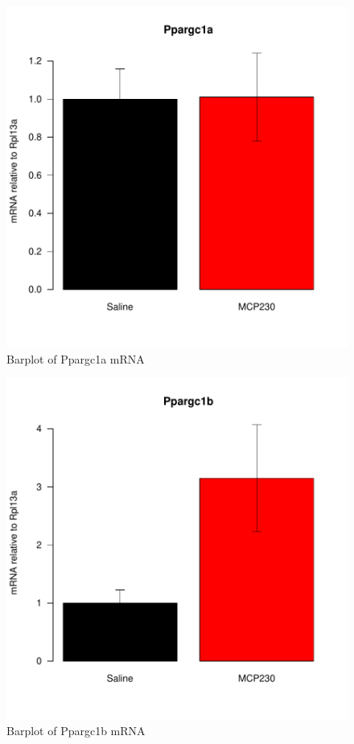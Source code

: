 \documentclass{article}
\begin{document}
\begin{figure}
\begin{center}
\includegraphics{MaternalParticulateMitoBiogen-barplotPpargc1a}
\end{center}
\caption{Barplot of Ppargc1a mRNA}
\label{fig:barplotPpargc1a}
\end{figure}

\begin{figure}
\begin{center}
\includegraphics{MaternalParticulateMitoBiogen-barplotPpargc1b}
\end{center}
\caption{Barplot of Ppargc1b mRNA}
\label{fig:barplotPpargc1b}
\end{figure}
\end{document}
